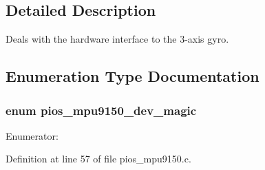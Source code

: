 \subsection{\-Detailed \-Description}
\-Deals with the hardware interface to the 3-\/axis gyro. 

\subsection{\-Enumeration \-Type \-Documentation}
\hypertarget{group___p_i_o_s___m_p_u9150_ga2924f0a0ab14681967b9e7f1e72e1c46}{
\subsubsection[{pios\-\_\-mpu9150\-\_\-dev\-\_\-magic}]{\setlength{\rightskip}{0pt plus 5cm}enum {\bf pios\-\_\-mpu9150\-\_\-dev\-\_\-magic}}}\label{group___p_i_o_s___m_p_u9150_ga2924f0a0ab14681967b9e7f1e72e1c46}
\begin{Desc}
\item[\-Enumerator\-: ]\par
\begin{description}
\item[{\em 
\hypertarget{group___p_i_o_s___m_p_u9150_gga2924f0a0ab14681967b9e7f1e72e1c46a111e3179bf78fadce5ff0039f2f78190}{\-P\-I\-O\-S\-\_\-\-M\-P\-U9150\-\_\-\-D\-E\-V\-\_\-\-M\-A\-G\-I\-C}\label{group___p_i_o_s___m_p_u9150_gga2924f0a0ab14681967b9e7f1e72e1c46a111e3179bf78fadce5ff0039f2f78190}
}]\end{description}
\end{Desc}



\-Definition at line 57 of file pios\-\_\-mpu9150.\-c.



